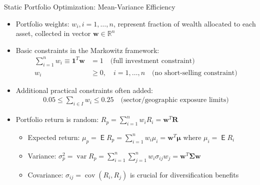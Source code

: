 \documentclass[10pt]{beamer}
\DeclareMathOperator\expc{\mathsf{E}}
\DeclareMathOperator\var{var}
\DeclareMathOperator\cov{cov}
\begin{document}
\begin{frame}{Static Portfolio Optimization: Mean-Variance Efficiency}
  \begin{itemize}[<+->]
    \item Portfolio weights: $w_i, i = 1, \ldots, n$, represent fraction of wealth allocated to each asset, collected in vector $\mathbf{w} \in \mathbb{R}^n$
    \item Basic constraints in the Markowitz framework:
      \begin{align*}
        \sum_{i=1}^{n} w_i \equiv \mathbf{1}^T\mathbf{w} &= 1 \quad \text{(full investment constraint)}\\
        w_i &\geqslant 0, \quad i = 1, \ldots, n \quad \text{(no short-selling constraint)}
      \end{align*}
    \item Additional practical constraints often added:
      \begin{align*}
        0.05 \leqslant \sum_{i \in I} w_i \leqslant 0.25 \quad \text{(sector/geographic exposure limits)}
      \end{align*}
    \item Portfolio return is random: $R_p = \sum_{i=1}^{n} w_iR_i = \mathbf{w}^T\mathbf{R}$
      \begin{itemize}
        \item Expected return: $\mu_p = \expc{R_p} = \sum_{i=1}^{n} w_i\mu_i = \mathbf{w}^T\boldsymbol{\mu}$ where $\mu_i = \expc{R_i}$
        \item Variance: $\sigma_p^2 = \var{R_p} = \sum_{i=1}^{n}\sum_{j=1}^{n} w_i\sigma_{ij}w_j = \mathbf{w}^T\boldsymbol{\Sigma}\mathbf{w}$
        \item Covariance: $\sigma_{ij} = \cov(R_i, R_j)$ is crucial for diversification benefits
      \end{itemize}
  \end{itemize}
\end{frame}
\end{document}

